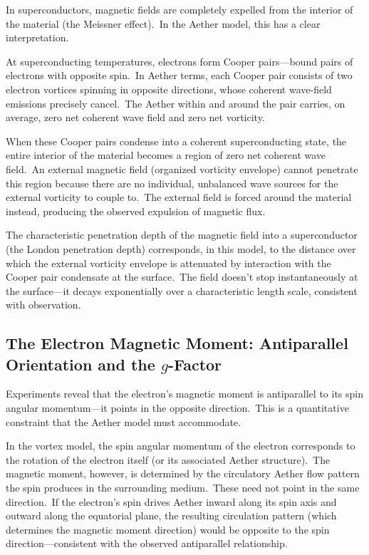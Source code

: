 ﻿\documentclass[12pt,letterpaper]{article}
\begin{document}
In superconductors, magnetic fields are completely expelled from the interior of the
material (the Meissner effect).\ In the Aether model, this has a clear interpretation.

At superconducting temperatures, electrons form Cooper pairs---bound pairs of electrons
with opposite spin.\ In Aether terms, each Cooper pair consists of two electron vortices
spinning in opposite directions, whose coherent wave-field emissions precisely cancel.\
The Aether within and around the pair carries, on average, zero net coherent wave
field and zero net vorticity.

When these Cooper pairs condense into a coherent superconducting state, the entire
interior of the material becomes a region of zero net coherent wave field.\ An external
magnetic field (organized vorticity envelope) cannot penetrate this region because
there are no individual, unbalanced wave sources for the external vorticity to couple
to.\ The external field is forced around the material instead, producing the observed
expulsion of magnetic flux.

The characteristic penetration depth of the magnetic field into a superconductor (the
London penetration depth) corresponds, in this model, to the distance over which the
external vorticity envelope is attenuated by interaction with the Cooper pair condensate
at the surface.\ The field doesn't stop instantaneously at the surface---it decays
exponentially over a characteristic length scale, consistent with observation.


\subsection{The Electron Magnetic Moment: Antiparallel Orientation and the \texorpdfstring{$g$}{g}-Factor}

Experiments reveal that the electron's magnetic moment is antiparallel to its spin angular
momentum---it points in the opposite direction.\ This is a quantitative constraint that
the Aether model must accommodate.

In the vortex model, the spin angular momentum of the electron corresponds to the rotation
of the electron itself (or its associated Aether structure).\ The magnetic moment, however,
is determined by the circulatory Aether flow pattern the spin produces in the surrounding
medium.\ These need not point in the same direction.\ If the electron's spin drives Aether
inward along its spin axis and outward along the equatorial plane, the resulting
circulation pattern (which determines the magnetic moment direction) would be opposite to
the spin direction---consistent with the observed antiparallel relationship.
\end{document}
